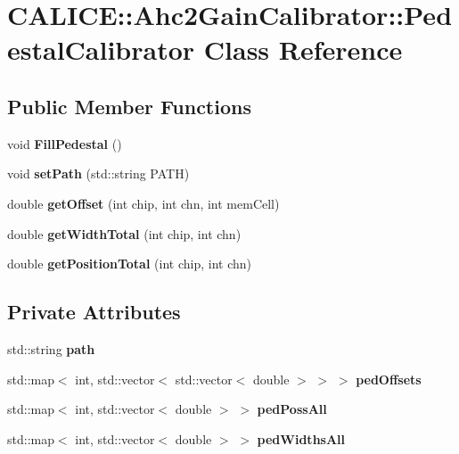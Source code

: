 \section{CALICE::Ahc2GainCalibrator::PedestalCalibrator Class Reference}
\label{classCALICE_1_1Ahc2GainCalibrator_1_1PedestalCalibrator}
\subsection*{Public Member Functions}
\begin{DoxyCompactItemize}
\item 
void {\bfseries FillPedestal} ()\label{classCALICE_1_1Ahc2GainCalibrator_1_1PedestalCalibrator_ac8495f26ef09163ccdc5e362c2d6821d}

\item 
void {\bfseries setPath} (std::string PATH)\label{classCALICE_1_1Ahc2GainCalibrator_1_1PedestalCalibrator_a3d8ff605481b2ae0d82b6efffecede38}

\item 
double {\bfseries getOffset} (int chip, int chn, int memCell)\label{classCALICE_1_1Ahc2GainCalibrator_1_1PedestalCalibrator_a00171a69b81f4e2ac6ca24b73b4b9327}

\item 
double {\bfseries getWidthTotal} (int chip, int chn)\label{classCALICE_1_1Ahc2GainCalibrator_1_1PedestalCalibrator_a7164284c298c314cb3db32210a88cc8c}

\item 
double {\bfseries getPositionTotal} (int chip, int chn)\label{classCALICE_1_1Ahc2GainCalibrator_1_1PedestalCalibrator_a92d1724e50988de6acff8f92da87f188}

\end{DoxyCompactItemize}
\subsection*{Private Attributes}
\begin{DoxyCompactItemize}
\item 
std::string {\bfseries path}\label{classCALICE_1_1Ahc2GainCalibrator_1_1PedestalCalibrator_ad9e48a9fea8ab725064fd89010bea802}

\item 
std::map$<$ int, std::vector$<$ std::vector$<$ double $>$ $>$ $>$ {\bfseries pedOffsets}\label{classCALICE_1_1Ahc2GainCalibrator_1_1PedestalCalibrator_aaaae6b293fabca77df498630602cd855}

\item 
std::map$<$ int, std::vector$<$ double $>$ $>$ {\bfseries pedPossAll}\label{classCALICE_1_1Ahc2GainCalibrator_1_1PedestalCalibrator_af030b52d51d501b355bcffcefd621e4e}

\item 
std::map$<$ int, std::vector$<$ double $>$ $>$ {\bfseries pedWidthsAll}\label{classCALICE_1_1Ahc2GainCalibrator_1_1PedestalCalibrator_a4738b2623dc8561000d33a3e348415d7}

\end{DoxyCompactItemize}


